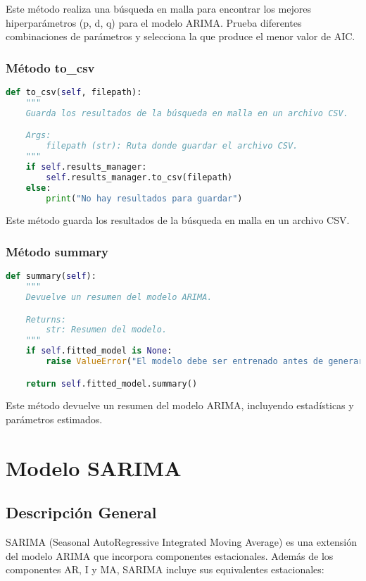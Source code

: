 \documentclass[12pt,letterpaper]{report}
\begin{document}
Este método realiza una búsqueda en malla para encontrar los mejores hiperparámetros (p, d, q) para el modelo ARIMA. Prueba diferentes combinaciones de parámetros y selecciona la que produce el menor valor de AIC.

\subsection{Método to\_csv}
\begin{lstlisting}[language=python]
def to_csv(self, filepath):
    """
    Guarda los resultados de la búsqueda en malla en un archivo CSV.

    Args:
        filepath (str): Ruta donde guardar el archivo CSV.
    """
    if self.results_manager:
        self.results_manager.to_csv(filepath)
    else:
        print("No hay resultados para guardar")
\end{lstlisting}

Este método guarda los resultados de la búsqueda en malla en un archivo CSV.

\subsection{Método summary}
\begin{lstlisting}[language=python]
def summary(self):
    """
    Devuelve un resumen del modelo ARIMA.

    Returns:
        str: Resumen del modelo.
    """
    if self.fitted_model is None:
        raise ValueError("El modelo debe ser entrenado antes de generar el resumen")

    return self.fitted_model.summary()
\end{lstlisting}

Este método devuelve un resumen del modelo ARIMA, incluyendo estadísticas y parámetros estimados.

\chapter{Modelo SARIMA}

\section{Descripción General}
SARIMA (Seasonal AutoRegressive Integrated Moving Average) es una extensión del modelo ARIMA que incorpora componentes estacionales. Además de los componentes AR, I y MA, SARIMA incluye sus equivalentes estacionales:
\end{document}
